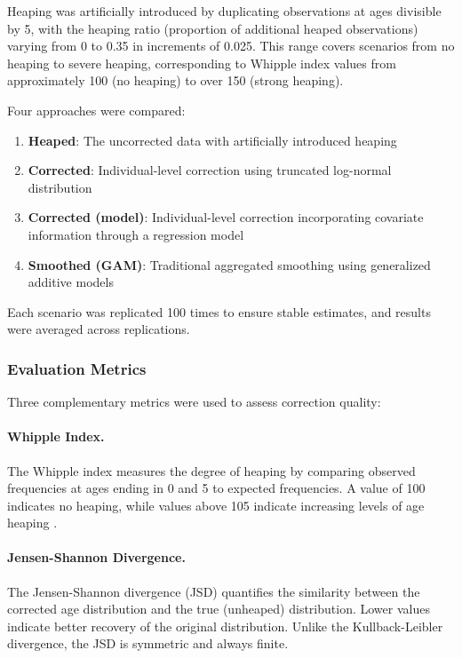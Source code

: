 \documentclass[12pt]{article}
\theoremstyle{plain}
\theoremstyle{definition}
\begin{document}
Heaping was artificially introduced by duplicating observations at ages divisible by 5, with the heaping ratio (proportion of additional heaped observations) varying from 0 to 0.35 in increments of 0.025. This range covers scenarios from no heaping to severe heaping, corresponding to Whipple index values from approximately 100 (no heaping) to over 150 (strong heaping).

Four approaches were compared:
\begin{enumerate}
    \item \textbf{Heaped}: The uncorrected data with artificially introduced heaping
    \item \textbf{Corrected}: Individual-level correction using truncated log-normal distribution
    \item \textbf{Corrected (model)}: Individual-level correction incorporating covariate information through a regression model
    \item \textbf{Smoothed (GAM)}: Traditional aggregated smoothing using generalized additive models
\end{enumerate}

Each scenario was replicated 100 times to ensure stable estimates, and results were averaged across replications.

\subsubsection{Evaluation Metrics}

Three complementary metrics were used to assess correction quality:

\paragraph{Whipple Index.} The Whipple index \citep{spoorenberg2007} measures the degree of heaping by comparing observed frequencies at ages ending in 0 and 5 to expected frequencies. A value of 100 indicates no heaping, while values above 105 indicate increasing levels of age heaping \citep{un55}.

\paragraph{Jensen-Shannon Divergence.} The Jensen-Shannon divergence (JSD) quantifies the similarity between the corrected age distribution and the true (unheaped) distribution. Lower values indicate better recovery of the original distribution. Unlike the Kullback-Leibler divergence, the JSD is symmetric and always finite.
\end{document}
